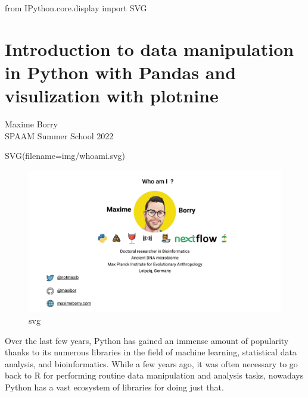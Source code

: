 \documentclass[
  letterpaper,
]{book}
\newenvironment{Shaded}{}{}
\newcommand{\ImportTok}[1]{\textcolor[rgb]{0.01,0.18,0.38}{#1}}
\newcommand{\NormalTok}[1]{\textcolor[rgb]{0.14,0.16,0.18}{#1}}
\newcommand{\OperatorTok}[1]{\textcolor[rgb]{0.14,0.16,0.18}{#1}}
\newcommand{\StringTok}[1]{\textcolor[rgb]{0.01,0.18,0.38}{#1}}
\begin{document}
\begin{Shaded}
\begin{Highlighting}[]
\ImportTok{from}\NormalTok{ IPython.core.display }\ImportTok{import}\NormalTok{ SVG}
\end{Highlighting}
\end{Shaded}

\hypertarget{introduction-to-data-manipulation-in-python-with-pandas-and-visulization-with-plotnine}{%
\section{Introduction to data manipulation in Python with Pandas and
visulization with
plotnine}\label{introduction-to-data-manipulation-in-python-with-pandas-and-visulization-with-plotnine}}

Maxime Borry\\
SPAAM Summer School 2022

\begin{Shaded}
\begin{Highlighting}[]
\NormalTok{SVG(filename}\OperatorTok{=}\StringTok{\textquotesingle{}img/whoami.svg\textquotesingle{}}\NormalTok{)}
\end{Highlighting}
\end{Shaded}

\begin{figure}

{\centering \includegraphics{index_files/mediabag/assets/images/chapters/introduction-to-python/tutorial_2_0.pdf}

}

\caption{svg}

\end{figure}

Over the last few years, Python has gained an immense amount of
popularity thanks to its numerous libraries in the field of machine
learning, statistical data analysis, and bioinformatics. While a few
years ago, it was often necessary to go back to R for performing routine
data manipulation and analysis tasks, nowadays Python has a vast
ecosystem of libraries for doing just that.
\end{document}
